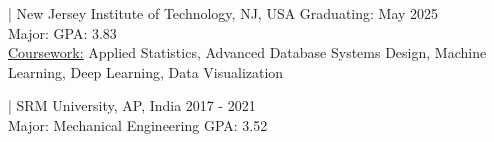  | New Jersey Institute of Technology, NJ, USA \hfill Graduating: May 2025 \\
{Major:  \hfill GPA: 3.83} \\
{\underline{Coursework:} Applied Statistics, Advanced Database Systems Design, Machine Learning, Deep Learning, Data Visualization}


 | SRM University, AP, India \hfill 2017 - 2021 \\
{Major: Mechanical Engineering \hfill GPA: 3.52} \\










